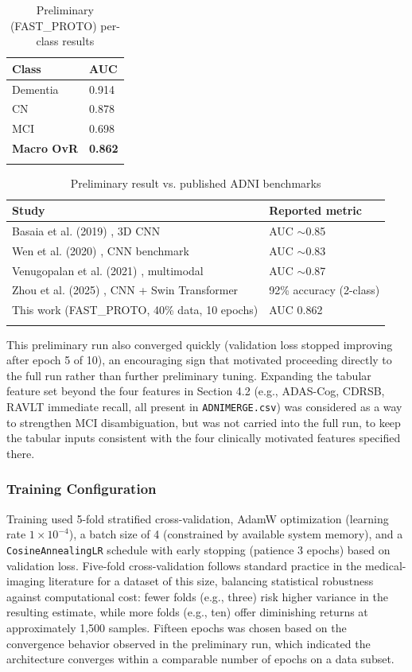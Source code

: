 \documentclass[pdflatex,sn-mathphys-num]{sn-jnl}%
\theoremstyle{thmstyleone}%
\theoremstyle{thmstyletwo}%
\theoremstyle{thmstylethree}%
\begin{document}
\begin{table}[htbp]
\caption{Preliminary (FAST\_PROTO) per-class results}\label{tab2}
\begin{tabular}{@{}ll@{}}
\toprule
Class & AUC \\
\midrule
Dementia & 0.914 \\
CN & 0.878 \\
MCI & 0.698 \\
\textbf{Macro OvR} & \textbf{0.862} \\
\botrule
\end{tabular}
\end{table}
\FloatBarrier

\begin{table}[htbp]
\caption{Preliminary result vs. published ADNI benchmarks}\label{tab3}
\begin{tabular}{@{}ll@{}}
\toprule
Study & Reported metric \\
\midrule
Basaia et al. (2019) \cite{bib12}, 3D CNN & AUC $\sim$0.85 \\
Wen et al. (2020) \cite{bib13}, CNN benchmark & AUC $\sim$0.83 \\
Venugopalan et al. (2021) \cite{bib16}, multimodal & AUC $\sim$0.87 \\
Zhou et al. (2025) \cite{bib28}, CNN + Swin Transformer & 92\% accuracy (2-class) \\
This work (FAST\_PROTO, 40\% data, 10 epochs) & AUC 0.862 \\
\botrule
\end{tabular}
\end{table}
\FloatBarrier

This preliminary run also converged quickly (validation loss stopped improving after epoch 5 of 10), an encouraging sign that motivated proceeding directly to the full run rather than further preliminary tuning. Expanding the tabular feature set beyond the four features in Section 4.2 (e.g., ADAS-Cog, CDRSB, RAVLT immediate recall, all present in \texttt{ADNIMERGE.csv}) was considered as a way to strengthen MCI disambiguation, but was not carried into the full run, to keep the tabular inputs consistent with the four clinically motivated features specified there.

\subsubsection{Training Configuration}\label{sec5_1_6}

Training used 5-fold stratified cross-validation, AdamW optimization (learning rate $1 \times 10^{-4}$), a batch size of 4 (constrained by available system memory), and a \texttt{CosineAnnealingLR} schedule with early stopping (patience 3 epochs) based on validation loss. Five-fold cross-validation follows standard practice in the medical-imaging literature for a dataset of this size, balancing statistical robustness against computational cost: fewer folds (e.g., three) risk higher variance in the resulting estimate, while more folds (e.g., ten) offer diminishing returns at approximately 1,500 samples. Fifteen epochs was chosen based on the convergence behavior observed in the preliminary run, which indicated the architecture converges within a comparable number of epochs on a data subset.
\end{document}
